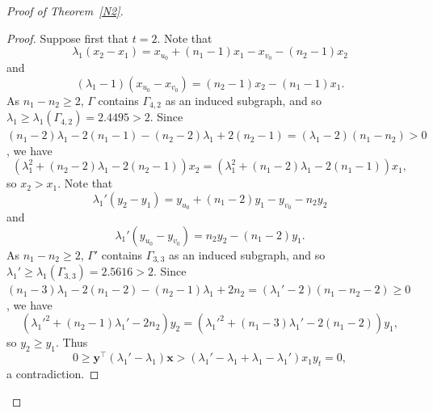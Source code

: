 \documentclass[10pt,a4paper]{amsart}
\numberwithin{equation}{section}
\begin{document}
\begin{proof}[Proof of Theorem~\ref{N2}]
\begin{proof}
Suppose first that $t=2$. 
Note that 
\[
\lambda_1(x_2-x_1)=x_{u_0}+(n_1-1)x_1-x_{v_0}-(n_2-1)x_2
\]
and
\[
(\lambda_1-1)(x_{u_0}-x_{v_0})=(n_2-1)x_2-(n_1-1)x_1.
\]
As $n_1-n_2\ge 2$, $\Gamma$ contains $\Gamma_{4,2}$ as an induced subgraph, and so $\lambda_1\ge \lambda_1(\Gamma_{4,2})=2.4495>2$. 
Since $(n_1-2)\lambda_1-2(n_1-1)-(n_2-2)\lambda_1+2(n_2-1)=(\lambda_1-2)(n_1-n_2)>0$, we have 
\[
\left(\lambda_1^2+(n_2-2)\lambda_1-2(n_2-1)\right)x_2=\left(\lambda_1^2+(n_1-2)\lambda_1-2(n_1-1)\right)x_1,  
\]
so $x_2>x_1$. 
Note that 
\[
\lambda_1'(y_2-y_1)=y_{u_0}+(n_1-2)y_1-y_{v_0}-n_2y_2
\]
and
\[
\lambda_1'(y_{u_0}-y_{v_0})=n_2y_2-(n_1-2)y_1. 
\]
As $n_1-n_2\ge 2$, $\Gamma'$ contains $\Gamma_{3,3}$ as an induced subgraph, and so $\lambda_1'\ge \lambda_1(\Gamma_{3,3})=2.5616>2$. 
Since $(n_1-3)\lambda_1-2(n_1-2)-(n_2-1)\lambda_1+2n_2=(\lambda_1'-2)(n_1-n_2-2)\ge 0$, we have 
\[
\left(\lambda_1'^2+(n_2-1)\lambda_1'-2n_2\right)y_2=\left(\lambda_1'^2+(n_1-3)\lambda_1'-2(n_1-2)\right)y_1,  
\]
so $y_2\ge y_1$. Thus
\[
0 \ge\mathbf{y}^\top(\lambda_1'-\lambda_1)\mathbf{x}>(\lambda_1'-\lambda_1+\lambda_1-\lambda_1')x_1y_t=0, 
\]
a contradiction. 


\end{proof}
\end{proof}
\end{document}
